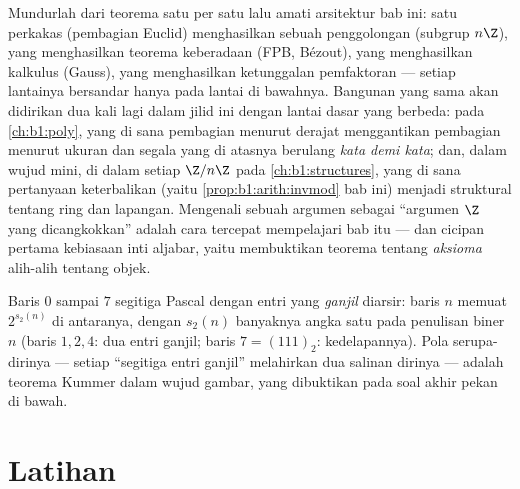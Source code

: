 \begin{remark}\label{rem:b1:arith:interlude}
Mundurlah dari teorema satu per satu lalu amati
arsitektur bab ini: satu perkakas (pembagian Euclid)
menghasilkan sebuah penggolongan (subgrup $n\Z$), yang menghasilkan
teorema keberadaan (FPB, Bézout), yang menghasilkan kalkulus
 (Gauss), yang menghasilkan ketunggalan pemfaktoran --- setiap
lantainya bersandar hanya pada lantai di bawahnya. Bangunan yang sama akan
didirikan dua kali lagi dalam jilid ini dengan lantai dasar yang berbeda:
pada \cref{ch:b1:poly}, yang di sana pembagian menurut derajat menggantikan pembagian
menurut ukuran dan segala yang di atasnya berulang \emph{kata demi kata}; dan, dalam
wujud mini, di dalam setiap $\Z/n\Z$ pada \cref{ch:b1:structures},
yang di sana pertanyaan keterbalikan (yaitu
\cref{prop:b1:arith:invmod} bab ini) menjadi  struktural tentang
ring dan lapangan. Mengenali sebuah argumen sebagai ``argumen $\Z$ yang
dicangkokkan'' adalah cara tercepat mempelajari bab itu --- dan
cicipan pertama kebiasaan inti aljabar, yaitu membuktikan teorema tentang
\emph{aksioma} alih-alih tentang objek.
\end{remark}

\begin{omfigure}

{\small Baris $0$ sampai $7$ segitiga Pascal dengan entri yang \emph{ganjil}
diarsir: baris $n$ memuat $2^{s_2(n)}$ di antaranya, dengan
$s_2(n)$ banyaknya angka satu pada penulisan biner $n$
(baris $1, 2, 4$: dua entri ganjil; baris $7 = (111)_2$: kedelapannya).
Pola serupa-dirinya --- setiap ``segitiga entri ganjil'' melahirkan dua
salinan dirinya --- adalah teorema Kummer dalam wujud gambar, yang dibuktikan
pada soal akhir pekan di bawah.}
\end{omfigure}

\section{Latihan}

